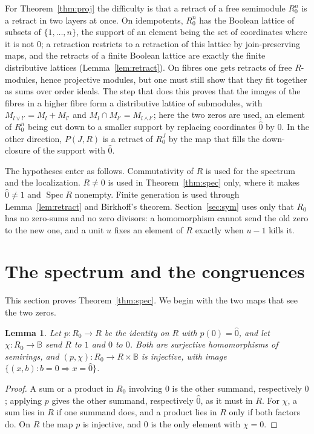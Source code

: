 \documentclass[11pt]{amsart}
\newtheorem{lemma}[thm]{Lemma}
\theoremstyle{remark}
\newcommand{\B}{\mathbb B}
\newcommand{\oz}{\widehat{0}}
\DeclareMathOperator{\Spec}{Spec}
\begin{document}
For Theorem~\ref{thm:proj} the difficulty is that a retract of a free semimodule $R_0^n$ is a retract in two layers at once. On idempotents, $R_0^n$ has the Boolean lattice of subsets of $\{1,\dots,n\}$, the support of an element being the set of coordinates where it is not $0$; a retraction restricts to a retraction of this lattice by join-preserving maps, and the retracts of a finite Boolean lattice are exactly the finite distributive lattices (Lemma~\ref{lem:retract}). On fibres one gets retracts of free $R$-modules, hence projective modules, but one must still show that they fit together as sums over order ideals. The step that does this proves that the images of the fibres in a higher fibre form a distributive lattice of submodules, with $M_{l\vee l'}=M_l+M_{l'}$ and $M_l\cap M_{l'}=M_{l\wedge l'}$; here the two zeros are used, an element of $R_0^n$ being cut down to a smaller support by replacing coordinates $\oz$ by $0$. In the other direction, $P(J,R)$ is a retract of $R_0^J$ by the map that fills the down-closure of the support with $\oz$.

The hypotheses enter as follows. Commutativity of $R$ is used for the spectrum and the localization. $R\ne0$ is used in Theorem~\ref{thm:spec} only, where it makes $\oz\ne1$ and $\Spec R$ nonempty. Finite generation is used through Lemma~\ref{lem:retract} and Birkhoff's theorem. Section~\ref{sec:sym} uses only that $R_0$ has no zero-sums and no zero divisors: a homomorphism cannot send the old zero to the new one, and a unit $u$ fixes an element of $R$ exactly when $u-1$ kills it.

\section{The spectrum and the congruences}

This section proves Theorem~\ref{thm:spec}. We begin with the two maps that see the two zeros.

\begin{lemma}\label{lem:normal}
Let $p\colon R_0\to R$ be the identity on $R$ with $p(0)=\oz$, and let $\chi\colon R_0\to\B$ send $R$ to $1$ and $0$ to $0$. Both are surjective homomorphisms of semirings, and $(p,\chi)\colon R_0\to R\times\B$ is injective, with image $\{(x,b):b=0\Rightarrow x=\oz\}$.
\end{lemma}

\begin{proof}
A sum or a product in $R_0$ involving $0$ is the other summand, respectively $0$; applying $p$ gives the other summand, respectively $\oz$, as it must in $R$. For $\chi$, a sum lies in $R$ if one summand does, and a product lies in $R$ only if both factors do. On $R$ the map $p$ is injective, and $0$ is the only element with $\chi=0$.
\end{proof}
\end{document}
